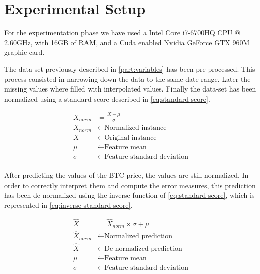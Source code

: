 
\chapter{Experimental Setup}
\label{ch:experimental-setup}

For the experimentation phase we have used a Intel Core i7-6700HQ CPU
@ 2.60GHz, with 16GB of RAM, and a Cuda enabled Nvidia GeForce GTX
960M graphic card.

The data-set previously described in \autoref{part:variables} has been
pre-processed. This process consisted in narrowing down the data to
the same date range. Later the missing values where filled with
interpolated values. Finally the data-set has been normalized using a
standard score described in \autoref{eq:standard-score}.

\begin{equation}
  \begin{aligned}
    \label{eq:standard-score}
    X_{norm} & = \frac{X-\mu}{\sigma} \\
    X_{norm} & \leftarrow \text{Normalized instance}
    \\
    X & \leftarrow \text{Original instance}
    \\
    \mu & \leftarrow \text{Feature mean}
    \\
    \sigma & \leftarrow \text{Feature standard deviation}
    \\
  \end{aligned}
\end{equation}

After predicting the values of the BTC price, the values are still
normalized. In order to correctly interpret them and compute the error
measures, this prediction has been de-normalized using the inverse
function of \autoref{eq:standard-score}, which is represented in 
\autoref{eq:inverse-standard-score}.

\begin{equation}
  \begin{aligned}
    \label{eq:inverse-standard-score}
    \hat{X} & = \hat{X}_{norm} \times \sigma + \mu \\
    \hat{X}_{norm} & \leftarrow \text{Normalized prediction}
    \\
    \hat{X} & \leftarrow \text{De-normalized prediction}
    \\
    \mu & \leftarrow \text{Feature mean}
    \\
    \sigma & \leftarrow \text{Feature standard deviation}
    \\
  \end{aligned}
\end{equation}

